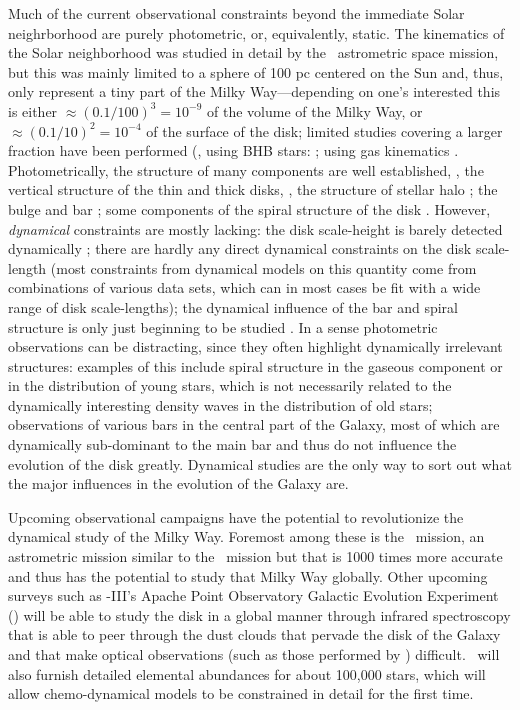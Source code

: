 Much of the current observational constraints beyond the immediate
Solar neighrborhood are purely photometric, or, equivalently,
static. The kinematics of the Solar neighborhood was studied in detail
by the \Hipparcos\ astrometric space mission, but this was mainly
limited to a sphere of 100 pc centered on the Sun and, thus, only
represent a tiny part of the Milky Way---depending on one's interested
this is either $\approx (0.1/100)^3 = 10^{-9}$ of the volume of the
Milky Way, or $\approx (0.1/10)^2 = 10^{-4}$ of the surface of the
disk; limited studies covering a larger fraction have been performed
(\eg, using BHB stars: \citealt{Xue08a}; using gas
kinematics \citep[\eg,][]{Merrifield92a}. Photometrically, the
structure of many components are well established, \eg, the vertical
structure of the thin and thick disks, \citep{Juric08a}, the structure
of stellar halo \citep{deJong10a}; the bulge and bar \citep{Blitz91a};
some components of the spiral structure of the
disk \citep{Benjamin05a}. However, \emph{dynamical} constraints are
mostly lacking: the disk scale-height is barely detected dynamically
\citep{Kuijken89a,Siebert03a}; there are hardly any
direct dynamical constraints on the disk scale-length (most
constraints from dynamical models on this quantity come from
combinations of various data sets, which can in most cases be fit with
a wide range of disk scale-lengths); the dynamical influence of the
bar and spiral structure is only just beginning to be
studied \citep[\eg,][]{dehnen00a,fux01a,deSimone04a,Quillen05a,Antoja09a}. In
a sense photometric observations can be distracting, since they often
highlight dynamically irrelevant structures: examples of this include
spiral structure in the gaseous component or in the distribution of
young stars, which is not necessarily related to the dynamically
interesting density waves in the distribution of old stars;
observations of various bars in the central part of the Galaxy, most
of which are dynamically sub-dominant to the main bar and thus do not
influence the evolution of the disk greatly. Dynamical studies are the
only way to sort out what the major influences in the evolution of the
Galaxy are.

Upcoming observational campaigns have the potential to revolutionize
the dynamical study of the Milky Way. Foremost among these is
the \Gaia\ mission, an astrometric mission similar to the \Hipparcos\
mission but that is 1000 times more accurate and thus has the
potential to study that Milky Way globally. Other upcoming surveys
such as \sdss-III's Apache Point Observatory Galactic Evolution
Experiment (\apogee) will be able to study the disk in a global manner
through infrared spectroscopy that is able to peer through the dust
clouds that pervade the disk of the Galaxy and that make optical
observations (such as those performed by \Gaia) difficult. \apogee\
will also furnish detailed elemental abundances for about 100,000
stars, which will allow chemo-dynamical models to be constrained in
detail for the first time.

